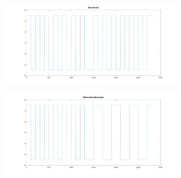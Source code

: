 \begin{enumerate}
\begin{center}
            \label{img:coding-sync-rz}
        \end{center}
        \begin{center}
            \centering
            \includegraphics[width=0.7\textwidth]{../octave/coding/sync/manchester.png}
            \label{img:coding-sync-manchester}
        \end{center}
        \begin{center}
            \centering
            \includegraphics[width=0.7\textwidth]{../octave/coding/sync/diffmanc.png}
            \label{img:coding-sync-diffmanc}
        \end{center}


\end{enumerate}
